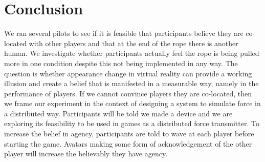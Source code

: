 \section{Conclusion}


We ran several pilots to see if it is feasible that participants believe they are co-located with other players and that at the end of the rope there is another human. We investigate whether participants actually feel the rope is being pulled more in one condition despite this not being implemented in any way. The question is whether appearance change in virtual reality can provide a working illusion and create a belief that is manifested in a measurable way, namely in the performance of players.
If we cannot convince players they are co-located, then we frame our experiment in the context of designing a system to simulate force in a distributed way. Participants will be told we made a device and we are exploring its feasibility to be used in games as a distributed force transmitter. 
To increase the belief in agency, participants are told to wave at each player before starting the game. Avatars making some form of acknowledgement of the other player will increase the believably they have agency. 
